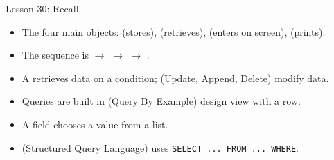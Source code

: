 \documentclass[aspectratio=169]{beamer}
\begin{document}
\begin{frame}{Lesson 30: Recall}
  \begin{itemize}
    \item The four main objects:  (stores), 
      (retrieves),  (enters on screen),  (prints).
    \item The sequence is  $\rightarrow$ 
      $\rightarrow$  $\rightarrow$ .
    \item A  retrieves data on a condition;  (Update, Append, Delete) modify data.
    \item Queries are built in  (Query By Example) design view with
      a  row.
    \item A  field chooses a value from a list.
    \item {} (Structured Query Language) uses
      \texttt{SELECT ... FROM ... WHERE}.
  \end{itemize}
\end{frame}
\end{document}
